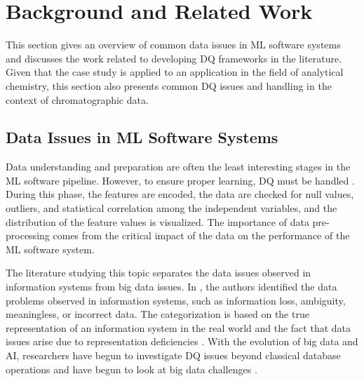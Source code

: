 \section{Background and Related Work}
\label{sec:relatedwork}
This section gives an overview of common data issues in ML software systems and discusses the work related to developing DQ frameworks in the literature. Given that the case study is applied to an application in the field of analytical chemistry, this section also presents common DQ issues and handling in the context of chromatographic data.

\subsection{Data Issues in ML Software Systems}
Data understanding and preparation are often the least interesting stages in the ML software pipeline. However, to ensure proper learning, DQ must be handled \cite{Corrales2018}. During this phase, the features are encoded, the data are checked for null values, outliers, and statistical correlation among the independent variables, and the distribution of the feature values is visualized. The importance of data pre-processing comes from the critical impact of the data on the performance of the ML software system. 

The literature studying this topic separates the data issues observed in information systems from big data issues. In \cite{Wand1996}, the authors identified the data problems observed in information systems, such as information loss, ambiguity, meaningless, or incorrect data. The categorization is based on the true representation of an information system in the real world and the fact that data issues arise due to representation deficiencies \cite{Wand1996}. With the evolution of big data and AI, researchers have begun to investigate DQ issues beyond classical database operations and have begun to look at big data challenges \cite{Gudivada2017}.

